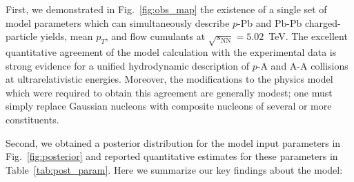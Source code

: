 \documentclass[aps,prc,reprint,amsmath,nofootinbib]{revtex4-1}
\newcommand{\sqrts}{\sqrt{s_\mathrm{NN}}}
\begin{document}
First, we demonstrated in Fig.~\ref{fig:obs_map} the existence of a single set of model parameters which can simultaneously describe $p$-Pb and Pb-Pb charged-particle yields, mean $p_T$, and flow cumulants at $\sqrts=5.02$~TeV.
The excellent quantitative agreement of the model calculation with the experimental data is strong evidence for a unified hydrodynamic description of $p$-A and A-A collisions at ultrarelativistic energies.
Moreover, the modifications to the physics model which were required to obtain this agreement are generally modest; one must simply replace Gaussian nucleons with composite nucleons of several or more constituents.

Second, we obtained a posterior distribution for the model input parameters in Fig.~\ref{fig:posterior} and reported quantitative estimates for these parameters in Table~\ref{tab:post_param}.
Here we summarize our key findings about the model:
\end{document}
